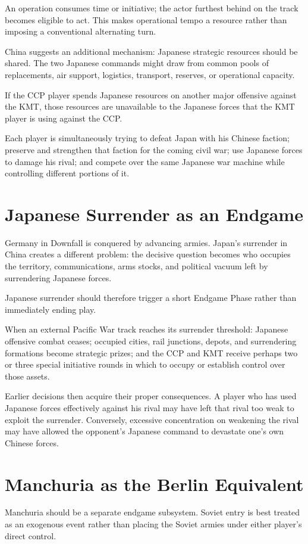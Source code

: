\documentclass[11pt]{article}
\begin{document}
An operation consumes time or initiative; the actor furthest behind on the track becomes eligible to act. This makes operational tempo a resource rather than imposing a conventional alternating turn.


China suggests an additional mechanism: Japanese strategic resources should be shared. The two Japanese commands might draw from common pools of replacements, air support, logistics, transport, reserves, or operational capacity.


If the CCP player spends Japanese resources on another major offensive against the KMT, those resources are unavailable to the Japanese forces that the KMT player is using against the CCP.


Each player is simultaneously trying to defeat Japan with his Chinese faction; preserve and strengthen that faction for the coming civil war; use Japanese forces to damage his rival; and compete over the same Japanese war machine while controlling different portions of it.


\section{Japanese Surrender as an Endgame}
Germany in Downfall is conquered by advancing armies. Japan's surrender in China creates a different problem: the decisive question becomes who occupies the territory, communications, arms stocks, and political vacuum left by surrendering Japanese forces.


Japanese surrender should therefore trigger a short Endgame Phase rather than immediately ending play.


When an external Pacific War track reaches its surrender threshold: Japanese offensive combat ceases; occupied cities, rail junctions, depots, and surrendering formations become strategic prizes; and the CCP and KMT receive perhaps two or three special initiative rounds in which to occupy or establish control over those assets.


Earlier decisions then acquire their proper consequences. A player who has used Japanese forces effectively against his rival may have left that rival too weak to exploit the surrender. Conversely, excessive concentration on weakening the rival may have allowed the opponent's Japanese command to devastate one's own Chinese forces.


\section{Manchuria as the Berlin Equivalent}
Manchuria should be a separate endgame subsystem. Soviet entry is best treated as an exogenous event rather than placing the Soviet armies under either player's direct control.
\end{document}
